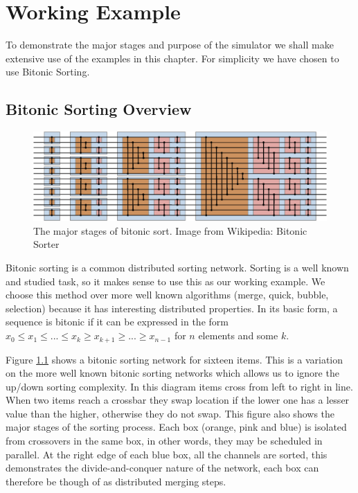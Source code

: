 \chapter{Working Example}
\label{chapExample}

To demonstrate the major stages and purpose of the simulator we shall make extensive use of the examples in this chapter.
For simplicity we have chosen to use Bitonic Sorting.

\section{Bitonic Sorting Overview}

\begin{figure}
\begin{center}
	\includegraphics[width=12cm]{figures/egBitonicSort.eps}
\caption{The major stages of bitonic sort.  Image from Wikipedia: Bitonic Sorter}
\label{figBitonicNormal}
\end{center}
\end{figure}

Bitonic sorting is a common distributed sorting network.
Sorting is a well known and studied task, so it makes sense to use this as our working example.
We choose this method over more well known algorithms (merge, quick, bubble, selection) because it has interesting distributed properties.
In its basic form, a sequence is bitonic if it can be expressed in the form $x_0 \leq x_1 \leq ... \leq x_k \geq x_{k+1} \geq ... \geq x_{n-1}$ for $n$ elements and some $k$.

Figure \ref{figBitonicNormal} shows a bitonic sorting network for sixteen items.
This is a variation on the more well known bitonic sorting networks which allows us to ignore the up/down sorting complexity.
In this diagram items cross from left to right in line.
When two items reach a crossbar they swap location if the lower one has a lesser value than the higher, otherwise they do not swap.
This figure also shows the major stages of the sorting process.
Each box (orange, pink and blue) is isolated from crossovers in the same box, in other words, they may be scheduled in parallel.
At the right edge of each blue box, all the channels are sorted, this demonstrates the divide-and-conquer nature of the network, each box can therefore be though of as distributed merging steps.

